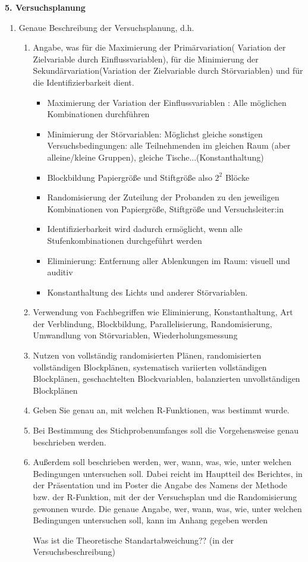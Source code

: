 \documentclass[ ngerman, fontsize= 12pt, paper=a4, headings=big, titlepage=true]{article}
\begin{document}
\textbf{5. Versuchsplanung}
\begin{enumerate}[-]
	\item  Genaue Beschreibung der Versuchsplanung, d.h.
	\begin{enumerate}[*]
		\item Angabe, was für die Maximierung der Primärvariation( Variation der Zielvariable durch Einflussvariablen), für die Minimierung der
		Sekundärvariation(Variation der Zielvariable durch Störvariablen) und für die Identifizierbarkeit dient.
		\begin{itemize}
			\item Maximierung der Variation  der Einflussvariablen : Alle möglichen Kombinationen durchführen\\
			\item Minimierung der Störvariablen: Möglichst gleiche sonstigen Versuchsbedingungen: alle Teilnehmenden im gleichen Raum (aber alleine/kleine Gruppen), gleiche Tische...(Konstanthaltung)
			\item Blockbildung Papiergröße und Stiftgröße  also $2^2$ Blöcke 
			\item Randomisierung der Zuteilung der Probanden  zu den jeweiligen Kombinationen von  Papiergröße, Stiftgröße und Versuchsleiter:in
			\item Identifizierbarkeit wird dadurch ermöglicht, wenn alle Stufenkombinationen durchgeführt werden
			\item Eliminierung: Entfernung aller Ablenkungen im Raum: visuell und auditiv
			\item Konstanthaltung des Lichts und anderer Störvariablen.
		\end{itemize}

		\item Verwendung von Fachbegriffen wie Eliminierung, Konstanthaltung, Art der Verblindung, Blockbildung, Parallelisierung, Randomisierung, Umwandlung von Störvariablen, Wiederholungsmessung
		\item Nutzen von vollständig randomisierten Plänen, randomisierten vollständigen Blockplänen, systematisch variierten vollständigen Blockplänen, geschachtelten Blockvariablen, balanzierten unvollständigen Blockplänen

		\item Geben Sie genau an, mit welchen R-Funktionen, was bestimmt wurde.
		\item Bei Bestimmung des Stichprobenumfanges soll die Vorgehensweise genau beschrieben
		werden. 
		\item Außerdem soll beschrieben werden, wer, wann, was, wie, unter welchen Bedingungen
		untersuchen soll. Dabei reicht im Hauptteil des Berichtes, in der Präsentation und
		im Poster die Angabe des Namens der Methode bzw. der R-Funktion, mit der
		der Versuchsplan und die Randomisierung gewonnen wurde. Die genaue Angabe,
		wer, wann, was, wie, unter welchen Bedingungen untersuchen soll, kann im Anhang
		gegeben werden
		
		
		
		
		Was ist die Theoretische Standartabweichung?? (in der Versuchsbeschreibung)
	\end{enumerate}
\end{enumerate}
\end{document}
